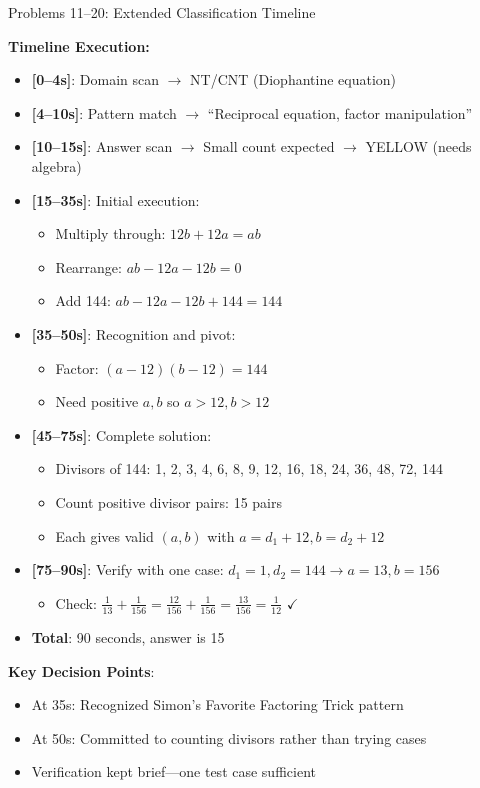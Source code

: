 \documentclass{article}
\begin{document}
\begin{timebox}{Problems 11--20: Extended Classification Timeline}
\begin{tcolorbox}[colback=yellow!5!white,colframe=yellow!50!black]
\textbf{Timeline Execution:}
\begin{itemize}[nosep]
\item \textbf{[0--4s]}: Domain scan $\rightarrow$ NT/CNT (Diophantine equation)
\item \textbf{[4--10s]}: Pattern match $\rightarrow$ ``Reciprocal equation, factor manipulation''
\item \textbf{[10--15s]}: Answer scan $\rightarrow$ Small count expected $\rightarrow$ YELLOW (needs algebra)
\item \textbf{[15--35s]}: Initial execution:
  \begin{itemize}[nosep]
  \item Multiply through: $12b + 12a = ab$
  \item Rearrange: $ab - 12a - 12b = 0$
  \item Add 144: $ab - 12a - 12b + 144 = 144$
  \end{itemize}
\item \textbf{[35--50s]}: Recognition and pivot:
  \begin{itemize}[nosep]
  \item Factor: $(a-12)(b-12) = 144$
  \item Need positive $a,b$ so $a>12, b>12$
  \end{itemize}
\item \textbf{[45--75s]}: Complete solution:
  \begin{itemize}[nosep]
  \item Divisors of 144: 1, 2, 3, 4, 6, 8, 9, 12, 16, 18, 24, 36, 48, 72, 144
  \item Count positive divisor pairs: 15 pairs
  \item Each gives valid $(a,b)$ with $a = d_1 + 12, b = d_2 + 12$
  \end{itemize}
\item \textbf{[75--90s]}: Verify with one case: $d_1=1, d_2=144 \rightarrow a=13, b=156$
  \begin{itemize}[nosep]
  \item Check: $\frac{1}{13} + \frac{1}{156} = \frac{12}{156} + \frac{1}{156} = \frac{13}{156} = \frac{1}{12}$ $\checkmark$
  \end{itemize}
\item \textbf{Total}: 90 seconds, answer is 15
\end{itemize}

\textbf{Key Decision Points}: 
\begin{itemize}[nosep]
\item At 35s: Recognized Simon's Favorite Factoring Trick pattern
\item At 50s: Committed to counting divisors rather than trying cases
\item Verification kept brief—one test case sufficient
\end{itemize}
\end{tcolorbox}
\end{timebox}
\end{document}
